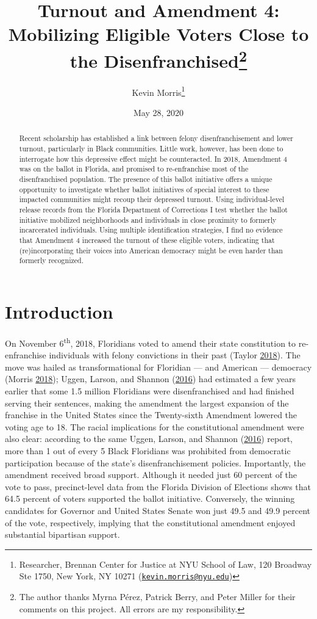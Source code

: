 \documentclass[
  12pt,
]{article}
\title{Turnout and Amendment 4: Mobilizing Eligible Voters Close to the Disenfranchised\thanks{The author thanks Myrna Pérez, Patrick Berry, and Peter Miller for their comments on this project. All errors are my responsibility.}}
\author{Kevin Morris\footnote{Researcher, Brennan Center for Justice at NYU School of Law, 120 Broadway Ste 1750, New York, NY 10271 (\href{mailto:kevin.morris@nyu.edu}{\nolinkurl{kevin.morris@nyu.edu}})}}
\date{May 28, 2020}
\begin{document}
\maketitle
\begin{abstract}
Recent scholarship has established a link between felony disenfranchisement and lower turnout, particularly in Black communities. Little work, however, has been done to interrogate how this depressive effect might be counteracted. In 2018, Amendment 4 was on the ballot in Florida, and promised to re-enfranchise most of the disenfranchised population. The presence of this ballot initiative offers a unique opportunity to investigate whether ballot initiatives of special interest to these impacted communities might recoup their depressed turnout. Using individual-level release records from the Florida Department of Corrections I test whether the ballot initiative mobilized neighborhoods and individuals in close proximity to formerly incarcerated individuals. Using multiple identification strategies, I find no evidence that Amendment 4 increased the turnout of these eligible voters, indicating that (re)incorporating their voices into American democracy might be even harder than formerly recognized.
\end{abstract}

\pagebreak

\doublespacing

\hypertarget{introduction}{%
\section*{Introduction}\label{introduction}}

On November 6\textsuperscript{th}, 2018, Floridians voted to amend their state constitution to re-enfranchise individuals with felony convictions in their past (Taylor \protect\hyperlink{ref-Taylor2018}{2018}). The move was hailed as transformational for Floridian --- and American --- democracy (Morris \protect\hyperlink{ref-Morris2018}{2018}); Uggen, Larson, and Shannon (\protect\hyperlink{ref-sentencing_2016}{2016}) had estimated a few years earlier that some 1.5 million Floridians were disenfranchised and had finished serving their sentences, making the amendment the largest expansion of the franchise in the United States since the Twenty-sixth Amendment lowered the voting age to 18. The racial implications for the constitutional amendment were also clear: according to the same Uggen, Larson, and Shannon (\protect\hyperlink{ref-sentencing_2016}{2016}) report, more than 1 out of every 5 Black Floridians was prohibited from democratic participation because of the state's disenfranchisement policies. Importantly, the amendment received broad support. Although it needed just 60 percent of the vote to pass, precinct-level data from the Florida Division of Elections shows that 64.5 percent of voters supported the ballot initiative. Conversely, the winning candidates for Governor and United States Senate won just 49.5 and 49.9 percent of the vote, respectively, implying that the constitutional amendment enjoyed substantial bipartisan support.
\end{document}
